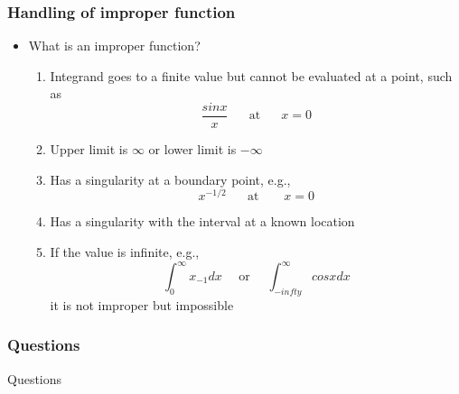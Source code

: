 \documentclass[10pt]{beamer}
\begin{document}
\begin{frame}
  \frametitle{Handling of improper function}
  \begin{itemize}
  \item What is an improper function?
    \pause
    \begin{enumerate}
    \item Integrand goes to a finite value but cannot be evaluated at a point, such as
      \[
        \frac{sin x}{x} \mbox{ ~~~ at ~~~ } x=0
      \]
    \item Upper limit is $\infty$ or lower limit is $-\infty$
    \item Has a singularity at a boundary point, e.g.,
      \[
        x^{-1/2} \mbox{~~~~ at ~~~~~} x = 0
      \]
    \item Has a singularity with the interval at a known location
    \item If the value is infinite, e.g.,
      \[
        \int_0^{\infty} x_{-1} dx \mbox{~~~~or~~~~} \int_{-infty}^{\infty} cos x dx
      \] it is not improper but impossible
    \end{enumerate}
  \end{itemize}
\end{frame}


\begin{frame}
  \frametitle{Questions}
  \centerline{\Huge Questions}
\end{frame}
\end{document}
